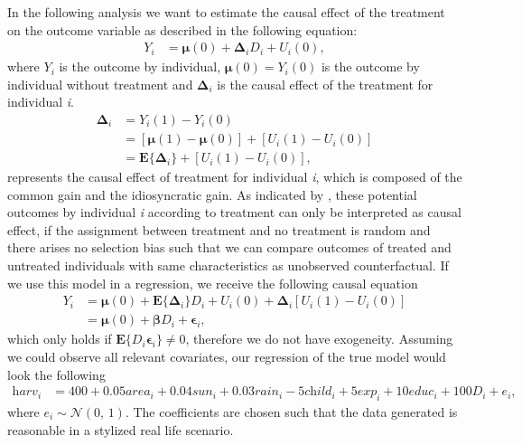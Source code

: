 In the following analysis we want to estimate the causal effect of the treatment on the outcome variable as described in the following equation: 
\begin{align}
	\label{eq:eq1}
	\textit{Y}_i &= \boldsymbol{\mu}(0) + \boldsymbol{\Delta}_i \textit{D}_i + \textit{U}_i(0),
\end{align}
where $\textit{Y}_i$ is the outcome by individual, $\boldsymbol{\mu}(0) = \textit{Y}_i(0)$ is the outcome by individual without treatment and $\boldsymbol{\Delta}_i$ is the causal effect of the treatment  for individual \textit{i}.
\begin{equation}
  \begin{aligned}
	\label{eq:eq2}
	\boldsymbol{\Delta}_i &= \textit{Y}_i(1) - \textit{Y}_i(0) \\
						 &= [\boldsymbol{\mu}(1)- \boldsymbol{\mu}(0)] + [\textit{U}_i(1)-\textit{U}_i(0)] \\
						 &= \boldsymbol{E} \{ \boldsymbol{\Delta}_i \} + [\textit{U}_i(1)-\textit{U}_i(0)],
  \end{aligned}
\end{equation}
represents the causal effect of treatment for individual \textit{i}, which is composed of the common gain and the idiosyncratic gain. As indicated by \cite{imbens2015causal}, these potential outcomes by individual \textit{i} according to treatment can only be interpreted as causal effect, if the assignment between treatment and no treatment is random and there arises no selection bias such that we can compare outcomes of treated and untreated individuals with same characteristics as unobserved counterfactual. If we use this model in a regression, we receive the following causal equation
\begin{equation}
  \begin{aligned}
	\label{eq:eq3}
	\textit{Y}_i &= \boldsymbol{\mu}(0) + \boldsymbol{E} \{ \boldsymbol{\Delta}_i \} \textit{D}_i + \textit{U}_i(0) + \boldsymbol{\Delta}_i[\textit{U}_i(1)-\textit{U}_i(0)] \\
				 &= \boldsymbol{\mu}(0) + \boldsymbol{\beta} \textit{D}_i + \boldsymbol{\epsilon}_i,
  \end{aligned}
\end{equation}
which only holds if $\boldsymbol{E}\{\textit{D}_i\boldsymbol{\epsilon}_i\} \neq 0$, therefore we do not have exogeneity. Assuming we could observe all relevant covariates, our regression of the true model would look the following
\begin{align}
	\label{eq:eq4}
	\textit{harv}_i &= 400 + 0.05 \textit{area}_i + 0.04 \textit{sun}_i + 0.03 \textit{rain}_i - 5 \textit{child}_i + 5 \textit{exp}_i + 10 \textit{educ}_i + 100 \textit{D}_i + \textit{e}_i,
\end{align}
where $\textit{e}_i \sim \mathcal{N}(0,\,1)$. The coefficients are chosen such that the data generated is reasonable in a stylized real life scenario. 


